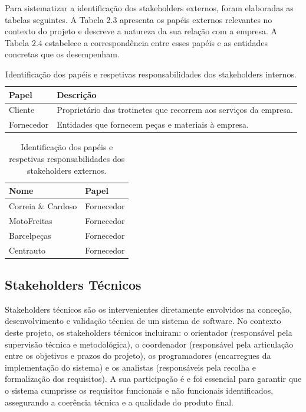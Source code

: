 \documentclass[a4paper,12pt]{scrreprt}
\begin{document}
Para sistematizar a identificação dos stakeholders externos, foram elaboradas as tabelas seguintes. A Tabela 2.3 apresenta os papéis externos relevantes no contexto do projeto e descreve a natureza da sua relação com a empresa. A Tabela 2.4 estabelece a correspondência entre esses papéis e as entidades concretas que os desempenham.

\begin{table}[H]
	\centering
	\setlength{\arrayrulewidth}{0.6pt}
	\begin{tabular}{|p{5cm}|p{9cm}|}
		\hline
		\rowcolor{gray!20!white}
		\textbf{Papel} & \textbf{Descrição} \\
		\hline
		Cliente & Proprietário das trotinetes que recorrem aos serviços da empresa.\\
		\hline
		Fornecedor & Entidades que fornecem peças e materiais à empresa. \\	
		\hline
	\end{tabular}
	\caption{Identificação dos papéis e respetivas responsabilidades dos stakeholders internos.}
\end{table}

\begin{table}[H]
	\centering
	\setlength{\arrayrulewidth}{0.6pt}
	\begin{tabular}{|p{5cm}|p{9cm}|}
		\hline
		\rowcolor{gray!20!white}
		\textbf{Nome} & \textbf{Papel} \\
		\hline
		Correia \& Cardoso & Fornecedor\\
		\hline
		MotoFreitas & Fornecedor \\
		\hline
		Barcelpeças & Fornecedor \\
		\hline
		Centrauto & Fornecedor \\
		\hline
	\end{tabular}
	\caption{Identificação dos papéis e respetivas responsabilidades dos stakeholders externos.}
\end{table}

\subsection{Stakeholders Técnicos}
Stakeholders técnicos são os intervenientes diretamente envolvidos na conceção, desenvolvimento e validação técnica de um sistema de software. No contexto deste projeto, os stakeholders técnicos incluiram: o orientador (responsável pela supervisão técnica e metodológica), o coordenador (responsável pela articulação entre os objetivos e prazos do projeto), os programadores (encarregues da implementação do sistema) e os analistas (responsáveis pela recolha e formalização dos requisitos). A sua participação é e foi essencial para garantir que o sistema cumprisse os requisitos funcionais e não funcionais identificados, assegurando a coerência técnica e a qualidade do produto final.
\end{document}
